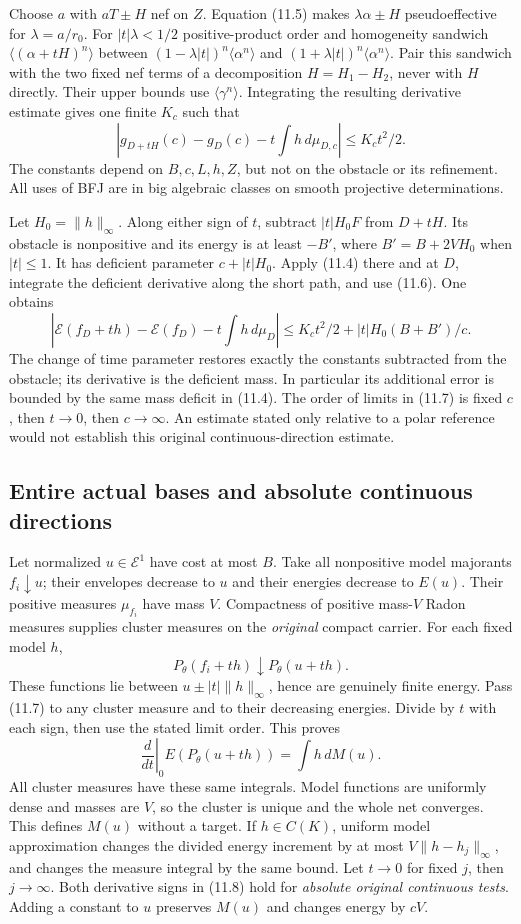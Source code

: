 \documentclass[10pt]{article}
\newcommand{\E}{\mathcal E}
\begin{document}
Choose $a$ with $aT\pm H$ nef on $Z$. Equation (11.5) makes
$\lambda\alpha\pm H$ pseudoeffective for $\lambda=a/r_0$.
For $|t|\lambda<1/2$ positive-product order and homogeneity sandwich
$\langle(\alpha+tH)^n\rangle$ between
$(1-\lambda|t|)^n\langle\alpha^n\rangle$ and
$(1+\lambda|t|)^n\langle\alpha^n\rangle$.
Pair this sandwich with the two fixed nef terms of a decomposition
$H=H_1-H_2$, never with $H$ directly. Their upper bounds use
$\langle\gamma^n\rangle$. Integrating the resulting derivative estimate
gives one finite $K_c$ such that
\[
 |g_{D+tH}(c)-g_D(c)-t\!\int h\,d\mu_{D,c}|
                                      \leq K_ct^2/2.             \tag{11.6}
\]
The constants depend on $B,c,L,h,Z$, but not on the obstacle or its
refinement. All uses of BFJ are in big algebraic classes on smooth
projective determinations.

Let $H_0=\|h\|_\infty$. Along either sign of $t$, subtract
$|t|H_0F$ from $D+tH$. Its obstacle is nonpositive and its energy is at
least $-B'$, where $B'=B+2VH_0$ when $|t|\leq1$.
It has deficient parameter $c+|t|H_0$. Apply (11.4) there and at $D$,
integrate the deficient derivative along the short path, and use (11.6).
One obtains
\[
 |\mathscr E(f_D+th)-\mathscr E(f_D)-t\!\int h\,d\mu_D|
 \leq K_ct^2/2+|t|H_0(B+B')/c.                     \tag{11.7}
\]
The change of time parameter restores exactly the constants subtracted
from the obstacle; its derivative is the deficient mass. In particular
its additional error is bounded by the same mass deficit in (11.4).
The order of limits in (11.7) is fixed $c$, then $t\to0$, then $c\to\infty$.
An estimate stated only relative to a polar reference would not establish
this original continuous-direction estimate.

\subsection{Entire actual bases and absolute continuous directions}
Let normalized $u\in\E^1$ have cost at most $B$. Take all nonpositive
model majorants $f_i\downarrow u$; their envelopes decrease to $u$ and
their energies decrease to $E(u)$. Their positive measures $\mu_{f_i}$
have mass $V$. Compactness of positive mass-$V$ Radon measures supplies
cluster measures on the \emph{original} compact carrier. For each fixed
model $h$,
\[
 P_\theta(f_i+th)\downarrow P_\theta(u+th).
\]
These functions lie between $u\pm|t|\|h\|_\infty$, hence are genuinely
finite energy. Pass (11.7) to any cluster measure and to their decreasing
energies. Divide by $t$ with each sign, then use the stated limit order.
This proves
\[
 \left.\frac d{dt}\right|_{0}E(P_\theta(u+th))=\int h\,dM(u).    \tag{11.8}
\]
All cluster measures have these same integrals. Model functions are
uniformly dense and masses are $V$, so the cluster is unique and the
whole net converges. This defines $M(u)$ without a target. If $h\in C(K)$,
uniform model approximation changes the divided energy increment by at
most $V\|h-h_j\|_\infty$, and changes the measure integral by the same
bound. Let $t\to0$ for fixed $j$, then $j\to\infty$. Both derivative
signs in (11.8) hold for \emph{absolute original continuous tests}.
Adding a constant to $u$ preserves $M(u)$ and changes energy by $cV$.
\end{document}

